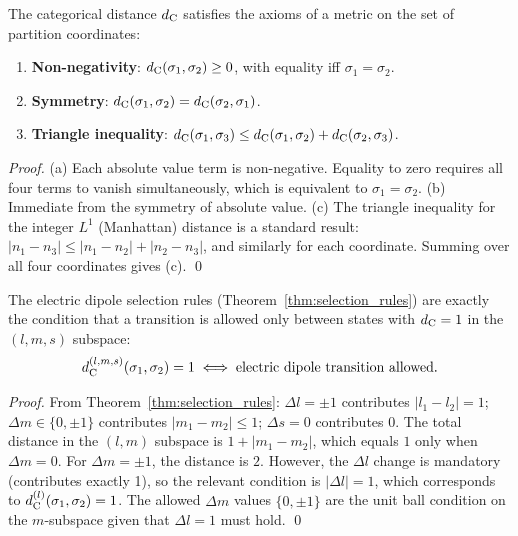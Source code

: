 \begin{proposition}
\label{prop:metric}
The categorical distance $d_{\mathrm{C}}$ satisfies the axioms of a metric on the set
of partition coordinates:
\begin{enumerate}[label=(\alph*)]
  \item \textbf{Non-negativity}: $d_{\mathrm{C}}(\sigma_1, \sigma_2) \geq 0$, with
        equality iff $\sigma_1 = \sigma_2$.
  \item \textbf{Symmetry}: $d_{\mathrm{C}}(\sigma_1, \sigma_2) = d_{\mathrm{C}}(\sigma_2, \sigma_1)$.
  \item \textbf{Triangle inequality}: $d_{\mathrm{C}}(\sigma_1, \sigma_3) \leq
        d_{\mathrm{C}}(\sigma_1, \sigma_2) + d_{\mathrm{C}}(\sigma_2, \sigma_3)$.
\end{enumerate}
\end{proposition}

\begin{proof}
(a) Each absolute value term is non-negative. Equality to zero requires all
four terms to vanish simultaneously, which is equivalent to $\sigma_1 = \sigma_2$.
(b) Immediate from the symmetry of absolute value.
(c) The triangle inequality for the integer $L^1$ (Manhattan) distance is a
standard result: $|n_1 - n_3| \leq |n_1 - n_2| + |n_2 - n_3|$, and similarly
for each coordinate. Summing over all four coordinates gives (c). \qed
\end{proof}

\begin{corollary}
\label{cor:unit_ball}
The electric dipole selection rules (Theorem~\ref{thm:selection_rules}) are
exactly the condition that a transition is allowed only between states with
$d_{\mathrm{C}} = 1$ in the $(l, m, s)$ subspace:
\begin{equation}
  d_{\mathrm{C}}^{(l,m,s)}(\sigma_1, \sigma_2) = 1 \iff \text{electric dipole transition allowed.}
\end{equation}
\end{corollary}

\begin{proof}
From Theorem~\ref{thm:selection_rules}: $\Delta l = \pm 1$ contributes
$|l_1 - l_2| = 1$; $\Delta m \in \{0, \pm 1\}$ contributes $|m_1 - m_2| \leq 1$;
$\Delta s = 0$ contributes $0$. The total distance in the $(l, m)$ subspace
is $1 + |m_1 - m_2|$, which equals $1$ only when $\Delta m = 0$.
For $\Delta m = \pm 1$, the distance is $2$. However, the $\Delta l$ change
is mandatory (contributes exactly 1), so the relevant condition is $|\Delta l| = 1$,
which corresponds to $d_{\mathrm{C}}^{(l)}(\sigma_1,\sigma_2) = 1$. The allowed $\Delta m$
values $\{0, \pm 1\}$ are the unit ball condition on the $m$-subspace given
that $\Delta l = 1$ must hold. \qed
\end{proof}

